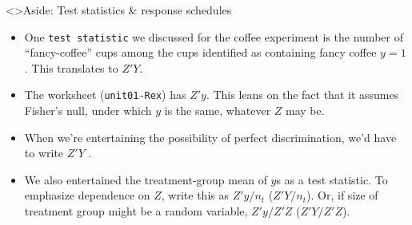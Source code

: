 \begin{frame}<\nottheirhandout>{Aside: Test statistics \& response schedules}
  
\begin{itemize}
\item One \texttt{test statistic} we discussed for the coffee experiment is the number of ``fancy-coffee'' cups among the cups identified as containing fancy coffee $y=1$. This translates to $Z'Y$. \pause


\item The worksheet (\texttt{unit01-Rex}) has $Z'y$.  This leans on the fact that it assumes Fisher's null, under which $y$ is the same, whatever $Z$ may be. \pause

\item When we're entertaining the possibility of perfect discrimination, we'd have to write $Z'Y$ .
\item We also entertained the treatment-group mean of $y$s as a test
  statistic. To emphasize dependence on $Z$, write this as $Z'y/n_{t}$
  ($Z'Y/n_{t}$). Or, if size of treatment group might be a random
  variable, $Z'y/Z'Z$  ($Z'Y/Z'Z$).
\end{itemize}
\end{frame}
